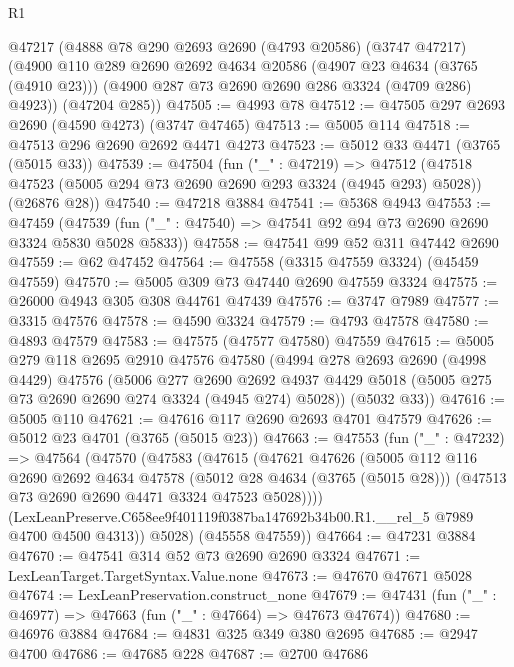 \begin{lexlean}{R1}
\begin{coremodule}
    @47217
    (@4888
      @78
      @290
      @2693
      @2690
      (@4793 @20586)
      (@3747 @47217)
      (@4900
        @110
        @289
        @2690
        @2692
        @4634
        @20586
        (@4907 @23 @4634 (@3765 (@4910 @23)))
        (@4900 @287 @73 @2690 @2690 @286 @3324 (@4709 @286) @4923))
      (@47204 @285))
@47505 := @4993 @78
@47512 := @47505 @297 @2693 @2690 (@4590 @4273) (@3747 @47465)
@47513 := @5005 @114
@47518 := @47513 @296 @2690 @2692 @4471 @4273
@47523 := @5012 @33 @4471 (@3765 (@5015 @33))
@47539 := @47504
    (fun ("_" : @47219) =>
    @47512 (@47518 @47523 (@5005 @294 @73 @2690 @2690 @293 @3324 (@4945 @293) @5028)) (@26876 @28))
@47540 := @47218 @3884
@47541 := @5368 @4943
@47553 := @47459
    (@47539 (fun ("_" : @47540) => @47541 @92 @94 @73 @2690 @2690 @3324 @5830 @5028 @5833))
@47558 := @47541 @99 @52 @311 @47442 @2690
@47559 := @62 @47452
@47564 := @47558 (@3315 @47559 @3324) (@45459 @47559)
@47570 := @5005 @309 @73 @47440 @2690 @47559 @3324
@47575 := @26000 @4943 @305 @308 @44761 @47439
@47576 := @3747 @7989
@47577 := @3315 @47576
@47578 := @4590 @3324
@47579 := @4793 @47578
@47580 := @4893 @47579
@47583 := @47575 (@47577 @47580) @47559
@47615 := @5005
    @279
    @118
    @2695
    @2910
    @47576
    @47580
    (@4994
      @278
      @2693
      @2690
      (@4998 @4429)
      @47576
      (@5006
        @277
        @2690
        @2692
        @4937
        @4429
        @5018
        (@5005 @275 @73 @2690 @2690 @274 @3324 (@4945 @274) @5028))
      (@5032 @33))
@47616 := @5005 @110
@47621 := @47616 @117 @2690 @2693 @4701 @47579
@47626 := @5012 @23 @4701 (@3765 (@5015 @23))
@47663 := @47553
    (fun ("_" : @47232) =>
    @47564
      (@47570
        (@47583
          (@47615
            (@47621
              @47626
              (@5005
                @112
                @116
                @2690
                @2692
                @4634
                @47578
                (@5012 @28 @4634 (@3765 (@5015 @28)))
                (@47513 @73 @2690 @2690 @4471 @3324 @47523 @5028))))
          (LexLeanPreserve.C658ee9f401119f0387ba147692b34b00.R1.__rel_5 @7989 @4700 @4500 @4313))
        @5028)
      (@45558 @47559))
@47664 := @47231 @3884
@47670 := @47541 @314 @52 @73 @2690 @2690 @3324
@47671 := LexLeanTarget.TargetSyntax.Value.none
@47673 := @47670 @47671 @5028
@47674 := LexLeanPreservation.construct_none
@47679 := @47431 (fun ("_" : @46977) => @47663 (fun ("_" : @47664) => @47673 @47674))
@47680 := @46976 @3884
@47684 := @4831 @325 @349 @380 @2695
@47685 := @2947 @4700
@47686 := @47685 @228
@47687 := @2700 @47686

\end{coremodule}
\end{lexlean}
